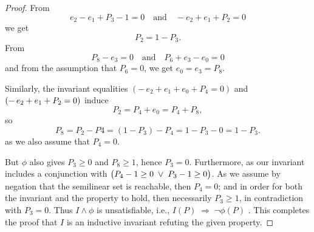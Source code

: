 \begin{proof}
	\noindent
	From
	\[
	e_{2}-e_{1}+P_{3}-1=0
	\quad\text{and}\quad
	-e_{2}+e_{1}+P_{2}=0
	\]
	we get
	\[
	P_{2}=1-P_{3}.
	\]
	From
	\[
	P_{8}-e_{3}=0
	\quad\text{and}\quad
	P_{6}+e_{3}-e_{0}=0
	\]
	and from the assumption that $P_6=0$, we get $e_{0}=e_{3}=P_{8}$.
	
	
	\noindent
	Similarly, the invariant equalities 
	$(-\,e_{2}+e_{1}+e_{0}+P_{4}=0)$ and $(	-\,e_{2}+e_{1}+\textcolor{black}{P_{2}}=0)$
	induce
	\[
	P_{2}=P_{4}+e_{0}=P_{4}+P_{8},
	\]
	so
	\[
	P_{8}=P_2-P4=(1-P_{3})-P_{4}=1-P_{3}-0=1-P_3.
	\]
	as we also assume that $P_4=0$.


	
	
	\noindent
	But $\phi$ also gives $P_{3}\ge0$ and $P_{8}\ge1$, hence $P_{3}=0$.  
	Furthermore, as our invariant includes a conjunction with $\bigl(P_{4}-1\ge0\;\lor\;\textcolor{black}{P_{3}}-1\ge0\bigr)$. As we assume by negation that the semilinear set is reachable, then $P_4=0$; and in order for both the invariant and the property to hold, then necessarily $P_3 \ge 1$, in contradiction with $P_3=0$.
	  Thus $I\land\phi$ is unsatisfiable, i.e., 
	$
	I(P)\;\Longrightarrow\;\neg\phi(P)$
	.
	This completes the proof that $I$ is an inductive invariant refuting the given property.
\end{proof}


